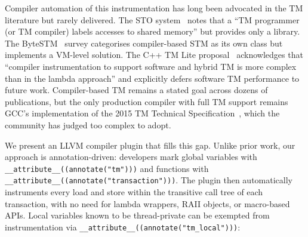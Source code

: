 \documentclass[article,12pt]{article}
\begin{document}
Compiler automation of this instrumentation has long been advocated in the TM literature
but rarely delivered.  The STO system~\cite{STO} notes that a ``TM programmer (or TM
compiler) labels accesses to shared memory'' but provides only a library.  The ByteSTM~\cite{ByteSTM}
survey categorises compiler-based STM as its own class but implements a VM-level solution.
The C++ TM Lite proposal~\cite{P1875} acknowledges that ``compiler instrumentation to
support software and hybrid TM is more complex than in the lambda approach'' and explicitly
defers software TM performance to future work.  Compiler-based TM remains a stated goal
across dozens of publications, but the only production compiler with full TM support remains
GCC's implementation of the 2015 TM Technical Specification~\cite{TMTS}, which the community
has judged too complex to adopt.

We present an LLVM compiler plugin that fills this gap.  Unlike prior work, our approach is
annotation-driven: developers mark global variables with
\texttt{\_\_attribute\_\_((annotate("tm")))} and functions with
\texttt{\_\_attribute\_\_((annotate("transaction")))}.  The plugin then automatically
instruments every load and store within the transitive call tree of
each transaction, with no need for lambda wrappers, RAII objects, or macro-based APIs.
Local variables known to be thread-private can be exempted from instrumentation
via \texttt{\_\_attribute\_\_((annotate("tm\_local")))}:
\end{document}
